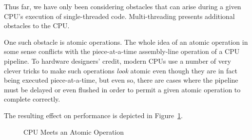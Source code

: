 Thus far, we have only been considering obstacles that can arise during
a given CPU's execution of single-threaded code.
Multi-threading presents additional obstacles to the CPU.

One such obstacle is atomic operations.
The whole idea of an atomic operation in some sense conflicts with
the piece-at-a-time assembly-line operation of a CPU pipeline.
To hardware designers' credit, modern CPUs use a number of very clever
tricks to make such operations \emph{look} atomic even though they
are in fact being executed piece-at-a-time, but even so, there are
cases where the pipeline must be delayed or even flushed in order to
permit a given atomic operation to complete correctly.

The resulting effect on performance is depicted in
Figure~\ref{fig:cpu:CPU Meets an Atomic Operation}.

\begin{figure}[htb]
\begin{center}
\end{center}
\caption{CPU Meets an Atomic Operation}
\label{fig:cpu:CPU Meets an Atomic Operation}
\end{figure}

